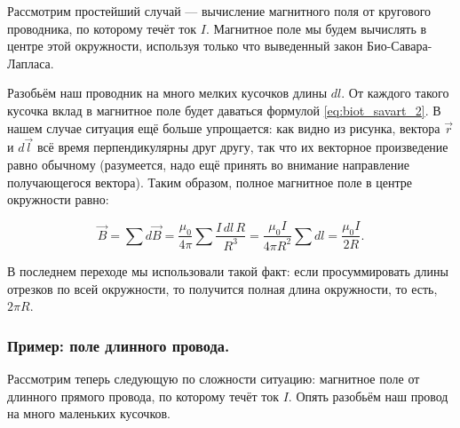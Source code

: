 \documentclass[a4paper,12pt]{article}
\numberwithin{equation}{section}
\begin{document}
Рассмотрим простейший случай — вычисление магнитного поля
от кругового проводника, по которому течёт ток $I$. Магнитное поле мы
будем вычислять в центре этой окружности, используя только что
выведенный закон Био-Савара-Лапласа.

\begin{figure}
\centering
{}
\label{fig:current_circle}
\end{figure}

Разобьём наш проводник на много мелких кусочков длины $dl$. От каждого
такого кусочка вклад в магнитное поле будет даваться формулой
\eqref{eq:biot_savart_2}. В нашем случае ситуация ещё больше
упрощается: как видно из рисунка, вектора $\vec{r}$ и $d\vec{l}$ всё
время перпендикулярны друг другу, так что их векторное произведение
равно обычному (разумеется, надо ещё принять во внимание направление
получающегося вектора). Таким образом, полное магнитное поле в центре
окружности равно: 

\begin{equation}
  \label{eq:ex_current_circle}
  \vec{B} = \sum d\vec{B} = \frac{\mu_0}{4\pi} \sum \frac{I\, dl\, R}{R^3} =
  \frac{\mu_0 I}{4 \pi R^2} \sum dl = \frac{\mu_0 I}{2R}.
\end{equation}

В последнем переходе мы использовали такой факт: если просуммировать
длины отрезков по всей окружности, то получится полная длина
окружности, то есть, $2\pi R$.

\subsubsection{Пример: поле длинного провода.}
\label{sec:wire_current}

Рассмотрим теперь следующую по сложности ситуацию: магнитное поле от
длинного прямого провода, по которому течёт ток $I$. Опять разобьём
наш провод на много маленьких кусочков. 

\begin{figure}
\centering
{}
\label{fig:current_wire}
\end{figure}
\end{document}
